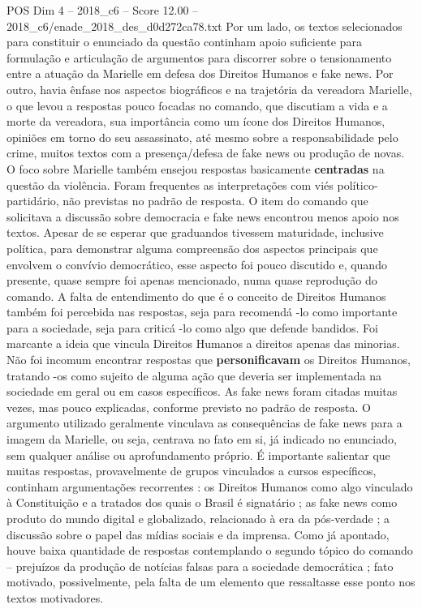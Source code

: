 \begin{textsample}{POS Dim 4 – 2018\_c6 – Score 12.00 – 2018\_c6/enade\_2018\_des\_d0d272ca78.txt}
Por um lado, os textos selecionados para constituir o enunciado da questão continham apoio suficiente para formulação e articulação de argumentos para discorrer sobre o tensionamento entre a atuação da Marielle em defesa dos Direitos Humanos e fake news.
Por outro, havia ênfase nos aspectos biográficos e na trajetória da vereadora Marielle, o que levou a respostas pouco focadas no comando, que discutiam a vida e a morte da vereadora, sua importância como um ícone dos Direitos Humanos, opiniões em torno do seu assassinato, até mesmo sobre a responsabilidade pelo crime, muitos textos com a presença/defesa de fake news ou produção de novas.
O foco sobre Marielle também ensejou respostas basicamente \textbf{centradas} na questão da violência.
Foram frequentes as interpretações com viés político-partidário, não previstas no padrão de resposta.
O item do comando que solicitava a discussão sobre democracia e fake news encontrou menos apoio nos textos.
Apesar de se esperar que graduandos tivessem maturidade, inclusive política, para demonstrar alguma compreensão dos aspectos principais que envolvem o convívio democrático, esse aspecto foi pouco discutido e, quando presente, quase sempre foi apenas mencionado, numa quase reprodução do comando.
A falta de entendimento do que é o conceito de Direitos Humanos também foi percebida nas respostas, seja para recomendá -lo como importante para a sociedade, seja para criticá -lo como algo que defende bandidos.
Foi marcante a ideia que vincula Direitos Humanos a direitos apenas das minorias.
Não foi incomum encontrar respostas que \textbf{personificavam} os Direitos Humanos, tratando -os como sujeito de alguma ação que deveria ser implementada na sociedade em geral ou em casos específicos.
As fake news foram citadas muitas vezes, mas pouco explicadas, conforme previsto no padrão de resposta.
O argumento utilizado geralmente vinculava as consequências de fake news para a imagem da Marielle, ou seja, centrava no fato em si, já indicado no enunciado, sem qualquer análise ou aprofundamento próprio.
É importante salientar que muitas respostas, provavelmente de grupos vinculados a cursos específicos, continham argumentações recorrentes : os Direitos Humanos como algo vinculado à Constituição e a tratados dos quais o Brasil é signatário ; as fake news como produto do mundo digital e globalizado, relacionado à era da pós-verdade ; a discussão sobre o papel das mídias sociais e da imprensa.
Como já apontado, houve baixa quantidade de respostas contemplando o segundo tópico do comando – prejuízos da produção de notícias falsas para a sociedade democrática ; fato motivado, possivelmente, pela falta de um elemento que ressaltasse esse ponto nos textos motivadores.

\end{textsample}
